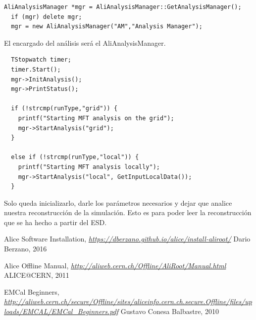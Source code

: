\documentclass{article}
\begin{document}
\begin{tcolorbox}[breakable]
\begin{verbatim}
AliAnalysisManager *mgr = AliAnalysisManager::GetAnalysisManager();
  if (mgr) delete mgr;
  mgr = new AliAnalysisManager("AM","Analysis Manager");
\end{verbatim}
\end{tcolorbox}
El encargado del an\'alisis ser\'a el AliAnalysisManager.


\begin{tcolorbox}[breakable]
\begin{verbatim}
  TStopwatch timer;
  timer.Start();
  mgr->InitAnalysis();
  mgr->PrintStatus();
  
  if (!strcmp(runType,"grid")) {
    printf("Starting MFT analysis on the grid");
    mgr->StartAnalysis("grid");
  }

  else if (!strcmp(runType,"local")) {
    printf("Starting MFT analysis locally");
    mgr->StartAnalysis("local", GetInputLocalData());
  }
\end{verbatim}
\end{tcolorbox}
Solo queda inicializarlo, darle los par\'ametros necesarios y dejar que analice nuestra reconstrucci\'on de la simulaci\'on. Esto es para poder leer la reconstrucci\'on que se ha hecho a partir del ESD.

\begin{thebibliography}{9}

  Alice Software Installation,
  \emph{\url{https://dberzano.github.io/alice/install-aliroot/}}
  Dario Berzano,
  2016
  
  Alice Offline Manual,
  \emph{\url{http://aliweb.cern.ch/Offline/AliRoot/Manual.html}}
  ALICE@CERN,
  2011

  EMCal Beginners,
  \emph{\url{http://aliweb.cern.ch/secure/Offline/sites/aliceinfo.cern.ch.secure.Offline/files/uploads/EMCAL/EMCal_Beginners.pdf}}
  Gustavo Conesa Balbastre,
  2010

\end{thebibliography}
\end{document}
